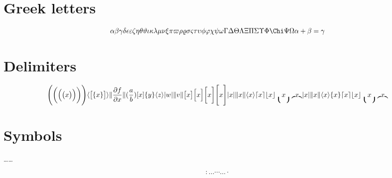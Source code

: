 \documentclass{article}
\begin{document}
\section{Greek letters}
\[
\alpha \beta \gamma \delta \epsilon \varepsilon \zeta \eta
\theta \vartheta \iota \kappa \lambda \mu \nu \xi
\pi \varpi \rho \varrho \sigma \varsigma \tau
\upsilon \phi \varphi \chi \psi \omega

\Gamma \Delta \Theta \Lambda \Xi \Pi \Sigma \Upsilon \Phi \Chi \Psi \Omega

\alpha+\beta=\gamma
\]
\section{Delimiters}
\[
\Biggl( \biggl( \Bigl( \bigl( x \bigr) \Bigr) \biggr) \Biggr)  \langle \bigl[ \{ x \} \bigr] \rangle \lVert \frac{\partial f}{\partial x}  \rVert

( \frac{a}{b} ) [ x ] \{ y \} \langle z \rangle  \lvert w \rvert  \lVert v \rVert

\bigl[ x \bigr] \Bigl[ x \Bigr] \biggl[ x \biggr] \Biggl[ x \Biggr]

\lvert x \rvert \lVert x \rVert \langle x \rangle \lceil x \rceil \lfloor x \rfloor \lgroup x \rgroup \lmoustache x \rmoustache

\lvert x \rvert \lVert x \rVert \langle x \rangle \lbrace x \rbrace \lceil x \rceil \lfloor x \rfloor \lgroup x \rgroup \lmoustache x \rmoustache
\]
\section{Symbols}

\colon \dots \cdots \ldots \cdot

\[
\colon \dots \cdots \ldots \cdot
\]
\end{document}
